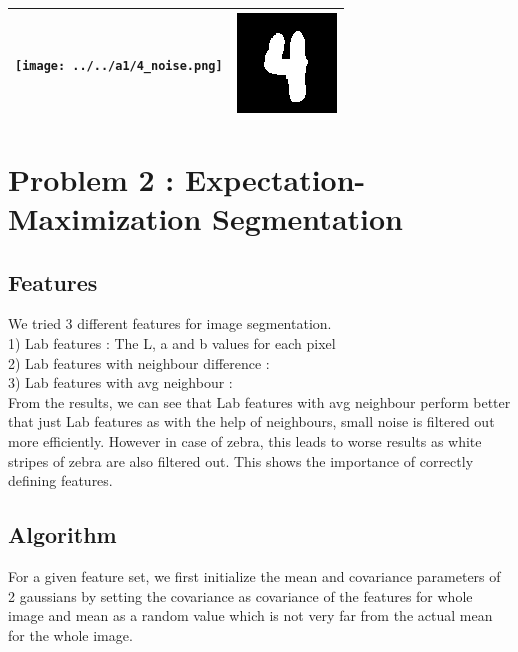 \documentclass{article}
\begin{document}
\begin{center}
 \begin{tabular}{||c c||}
 \hline
 \texttt{[image: ../../a1/4\_noise.png]} & \includegraphics[width=.4\linewidth]{../image-denoising/output/4_denoise.png} \\ 
 \hline

\end{tabular}
\end{center}


\section{Problem 2 : Expectation-Maximization Segmentation}
\subsection{Features}
We tried 3 different features for image segmentation.\\
1) Lab features : The L, a and b values for each pixel \\
2) Lab features with neighbour difference : \\
3) Lab features with avg neighbour : \\

From the results, we can see that Lab features with avg neighbour perform better that just Lab features as with the help of neighbours, small noise is filtered out more efficiently. However in case of zebra, this leads to worse results as white stripes of zebra are also filtered out. This shows the importance of correctly defining features.

\subsection{Algorithm}
For a given feature set, we first initialize the mean and covariance parameters of 2 gaussians by setting the covariance as covariance of the features for whole image and mean as a random value which is not very far from the actual mean for the whole image.
\end{document}

